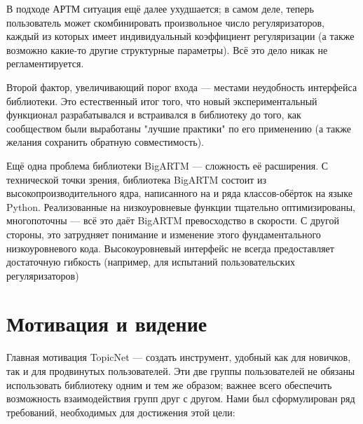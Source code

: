 В подходе АРТМ ситуация ещё далее ухудшается; в самом деле, теперь пользователь может скомбинировать произвольное число регуляризаторов, каждый из которых имеет индивидуальный коэффициент регуляризации (а также возможно какие-то другие структурные параметры). Всё это дело никак не регламентируется.

Второй фактор, увеличивающий порог входа --- местами неудобность интерфейса библиотеки. Это естественный итог того, что новый экспериментальный функционал разрабатывался и встраивался в библиотеку до того, как сообществом были выработаны "лучшие практики" по его применению (а также желания сохранить обратную совместимость). 


Ещё одна проблема библиотеки BigARTM --- сложность её расширения. С технической точки зрения, библиотека BigARTM состоит из высокопроизводительного ядра, написанного на \cpp и ряда классов-обёрток на языке Python. Реализованные на \cpp низкоуровневые функции тщательно оптимизированы, многопоточны --- всё это даёт BigARTM превосходство в скорости. С другой стороны, это затрудняет понимание и изменение этого фундаментального низкоуровневого кода. Высокоуровневый интерфейс не всегда предоставляет достаточную гибкость (например, для испытаний пользовательских регуляризаторов)

\section{Мотивация и видение}

Главная мотивация TopicNet --- создать инструмент, удобный как для новичков, так и для продвинутых пользователей. Эти две группы пользователей не обязаны использовать библиотеку одним и тем же образом; важнее всего обеспечить возможность взаимодействия групп друг с другом. Нами был сформулирован ряд требований, необходимых для достижения этой цели:

